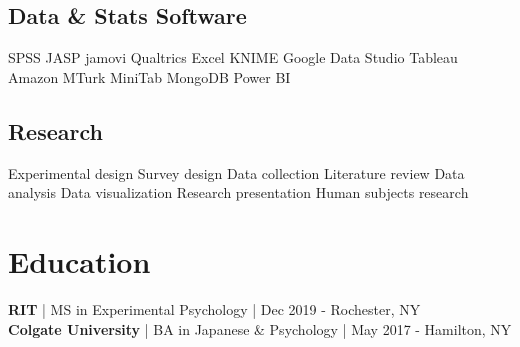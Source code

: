 \documentclass[letterpaper]{deedy-resume_sm} %
\begin{document}
\subsection{Data \& Stats Software}
SPSS \textbullet{} JASP \textbullet{} jamovi \textbullet{} Qualtrics \textbullet{} Excel \textbullet{} KNIME \textbullet{} Google Data Studio \textbullet{} Tableau \textbullet{} Amazon MTurk \textbullet{} MiniTab \textbullet{} MongoDB \textbullet{} Power BI
\subsection{Research}
Experimental design \textbullet{} Survey design \textbullet{} Data collection \textbullet{} Literature review \textbullet{} Data analysis \textbullet{} Data visualization \textbullet{} Research presentation \textbullet{} Human subjects research %


\section{Education} 
\textbf{RIT} | MS in Experimental Psychology | Dec 2019 - Rochester, NY\\
\textbf{Colgate University} | BA in Japanese \& Psychology | May 2017 - Hamilton, NY\\
\end{document}

